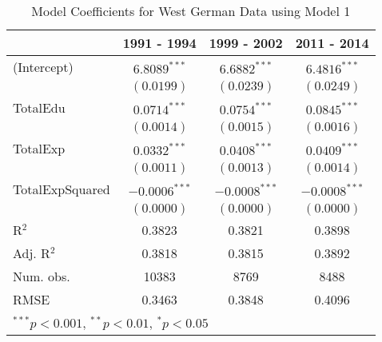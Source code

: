 
\begin{table}
\begin{center}
\begin{tiny}
\begin{tabular}{l c c c }
\hline
 & 1991 - 1994 & 1999 - 2002 & 2011 - 2014 \\
\hline
(Intercept)     & $6.8089^{***}$  & $6.6882^{***}$  & $6.4816^{***}$  \\
                & $(0.0199)$      & $(0.0239)$      & $(0.0249)$      \\
TotalEdu        & $0.0714^{***}$  & $0.0754^{***}$  & $0.0845^{***}$  \\
                & $(0.0014)$      & $(0.0015)$      & $(0.0016)$      \\
TotalExp        & $0.0332^{***}$  & $0.0408^{***}$  & $0.0409^{***}$  \\
                & $(0.0011)$      & $(0.0013)$      & $(0.0014)$      \\
TotalExpSquared & $-0.0006^{***}$ & $-0.0008^{***}$ & $-0.0008^{***}$ \\
                & $(0.0000)$      & $(0.0000)$      & $(0.0000)$      \\
\hline
R$^2$           & 0.3823          & 0.3821          & 0.3898          \\
Adj. R$^2$      & 0.3818          & 0.3815          & 0.3892          \\
Num. obs.       & 10383           & 8769            & 8488            \\
RMSE            & 0.3463          & 0.3848          & 0.4096          \\
\hline
\multicolumn{4}{l}{\tiny{$^{***}p<0.001$, $^{**}p<0.01$, $^*p<0.05$}}
\end{tabular}
\end{tiny}
\caption{Model Coefficients for West German Data using Model 1}
\label{table:WestModelsTotal}
\end{center}
\end{table}
